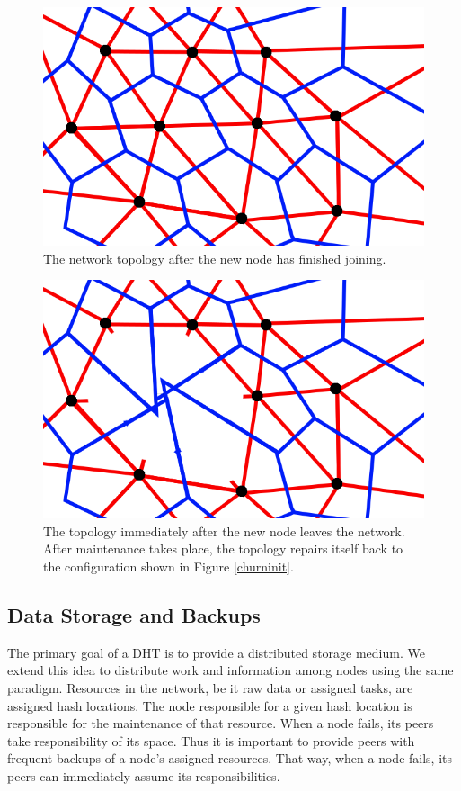 \documentclass[11pt]{IEEEtran} %
\begin{document}
\begin{figure}
    \includegraphics[width=\linewidth]{voronoi-example}
    \caption{The network topology after the new node has finished joining.}
    \label{churndone}
\end{figure}

\begin{figure}
    \includegraphics[width=\linewidth]{voronoi-churn1}
    \caption{The topology immediately after the new node leaves the network. After maintenance takes place, the topology repairs itself back to the configuration shown in Figure \ref{churninit}.}
    \label{churndrop}
\end{figure}


\subsection{Data Storage and Backups}
The primary goal of a DHT is to provide a distributed storage medium. We extend this idea to distribute work and information among nodes using the same paradigm. Resources in the network, be it raw data or assigned tasks, are assigned hash locations. The node responsible for a given hash location is responsible for the maintenance of that resource. When a node fails, its peers take responsibility of its space. Thus it is important to provide peers with frequent backups of a node's assigned resources.  That way, when a node fails, its peers can immediately assume its responsibilities.
\end{document}
